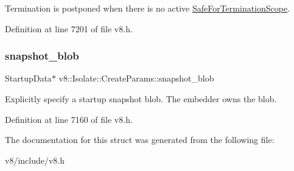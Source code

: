 Termination is postponed when there is no active \mbox{\hyperlink{classv8_1_1Isolate_1_1SafeForTerminationScope}{Safe\+For\+Termination\+Scope}}. 

Definition at line 7201 of file v8.\+h.

\mbox{\label{structv8_1_1Isolate_1_1CreateParams_a25d38476e4dec79ae96c59292eee4a64}} 
\subsubsection{\texorpdfstring{snapshot\+\_\+blob}{snapshot\_blob}}
{\footnotesize\ttfamily Startup\+Data$\ast$ v8\+::\+Isolate\+::\+Create\+Params\+::snapshot\+\_\+blob}

Explicitly specify a startup snapshot blob. The embedder owns the blob. 

Definition at line 7160 of file v8.\+h.



The documentation for this struct was generated from the following file\+:\begin{DoxyCompactItemize}
\item 
v8/include/v8.\+h\end{DoxyCompactItemize}
